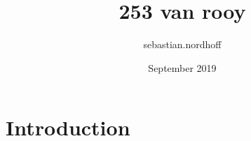 \documentclass{article}
\title{253 van rooy}
\author{sebastian.nordhoff }
\date{September 2019}
\begin{document}
\maketitle

\section{Introduction}
\end{document}
